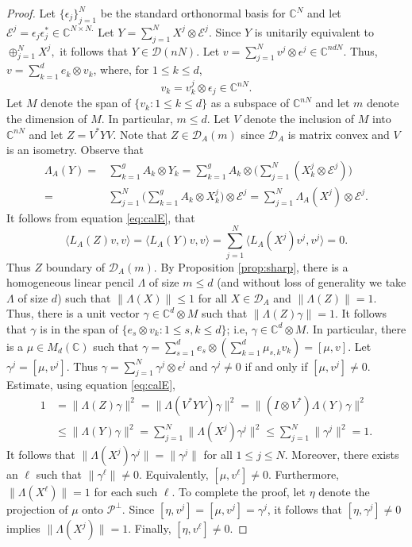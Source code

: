 \documentclass[12pt,makeidx]{amsart}
\numberwithin{equation}{section}
\def\cD{ {{\mathcal D}}}
\def\cEE{ {{\mathcal E}}}
\def\bbF{ {\mathbb C}}
\def\C{ {\mathbb{C}} }
\def\cD{ {\mathcal D} }
\def\Fdd{M_d(\mathbb C)}
\begin{document}
\begin{proof}
Let $\{\epsilon_j \}_{j=1}^N$ be the standard orthonormal basis for $\C^N$ and let $\mathcal{E}^j=\epsilon_j \epsilon_j^* \in \C^{N \times N.}$
Let  $Y=\sum_{j=1}^N X^j \otimes \cEE^j$. Since $Y$ is unitarily equivalent to $\oplus_{j=1}^N X^j,$ it follows that $Y\in \cD (nN)$.  
Let  $v=\sum_{j=1}^N v^j \otimes \epsilon^j \in \bbF^{ndN}$. Thus,   $v=\sum_{k=1}^d e_k\otimes v_k$, where, for $1\le k\le d$, 
\[
 v_k =  v^j_k \otimes \epsilon_j  \in \bbF^{nN}. 
\]
Let $M$ denote the span of $\{v_k: 1\le k \le d\}$ as a subspace of $\bbF^{nN}$ and let $m$ denote the dimension of $M.$ In particular, $m \leq d$. 
Let $V$ denote the inclusion  of $M$ into $\bbF^{nN}$ and  let $Z=V^*YV$.  Note that 
$Z\in \cD_A(m)$ since $\cD_A$ is matrix convex and $V$ is an isometry. Observe that 
\begin{equation}
\label{eq:calE}
\begin{split}
 \Lambda_A(Y) = & \sum_{k=1}^g A_k \otimes Y_k =\sum_{k=1}^g A_k\otimes \big (\sum_{j=1}^N (X^j_k  \otimes \mathcal E^j) \big ) \\
 = & \sum_{j=1}^N \big (\sum_{k=1}^g A_k\otimes X^j_k \big )\otimes \mathcal E^j = \sum_{j=1}^N \Lambda_A(X^j)\otimes \mathcal E^j.
\end{split}
\end{equation}
It follows from equation \eqref{eq:calE}, that 
\[
 \langle L_A(Z)v,v\rangle  = \langle L_A(Y)v,v\rangle = \sum_{j=1}^N \langle L_A(X^j)v^j,v^j\rangle  = 0.
\]
 Thus $Z$ boundary of $\cD_A(m)$.  By Proposition \ref{prop:sharp}, there is a homogeneous linear pencil $\Lambda$ of size $m \leq d$ (and without loss of generality we take $\Lambda$ of size $d$)  such that $\|\Lambda(X)\|\le 1$ for all $X\in \cD_A$ and $\|\Lambda(Z)\|=1$.  Thus, there is a unit vector $\gamma\in \bbF^d\otimes  M$ such that $\|\Lambda(Z)\gamma\|=1$.  It follows that $\gamma$ is in the span of $\{e_s\otimes v_k:1\le s, k\le d\}$; i.e, $\gamma\in \C^d\otimes M$.  In particular, there is a $\mu\in\Fdd$ such that $\gamma = \sum_{s=1}^d e_s\otimes (\sum_{k=1}^d \mu_{s,k} v_k)=[ \mu, v]$. Let $\gamma^j = [ \mu,v^j]$.  Thus 
$\gamma = \sum_{j=1}^N \gamma^j \otimes \epsilon^j$ and
 $\gamma^j\ne 0$ if and only if $[ \mu,v^j] \ne 0$.  Estimate, using equation \eqref{eq:calE},
\[
 \begin{split}
 1 & =   \|\Lambda(Z)\gamma\|^2 
   = \| \Lambda(V^*YV)\gamma\|^2 
   =   \| (I\otimes V^*) \Lambda(Y) \gamma\|^2 \\
   &\le \|\Lambda(Y)\gamma\|^2
     =  \sum_{j=1}^N \|\Lambda(X^j)\gamma^j \|^2 
   \le \sum_{j=1}^N \|\gamma^j\|^2 = 1.
\end{split}
\]
It follows that $\|\Lambda(X^j)\gamma^j\|=\|\gamma^j\|$ for all $1\le j\le N$.  Moreover, there exists an $\ell$ such that $\|\gamma^\ell\|\ne 0.$  Equivalently, $[ \mu,v^\ell] \ne 0$. Furthermore, $\|\Lambda(X^\ell)\|=1$  for each such $\ell$.  To complete the proof, let $\eta$ denote the projection of $\mu$ onto $\mathcal P^\perp$.  Since $[ \eta,v^j] =[ \mu, v^j] =\gamma^j$, it follows that $[ \eta,\gamma^j] \ne 0$ implies $\|\Lambda(X^j)\|=1$. Finally,  $[ \eta,v^\ell] \ne 0.$ 
\end{proof}
\end{document}
